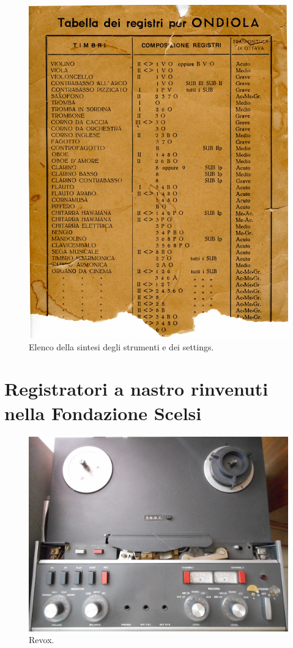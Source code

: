 \begin{figure}[H]
    \centering
    \includegraphics[width=.8\textwidth]{docs/ondiola-doc002.pdf}
    \caption{Elenco della sintesi degli strumenti e dei settings.}
\end{figure}

\section{Registratori a nastro rinvenuti nella Fondazione Scelsi}

\begin{figure}[H]
    \centering
    \includegraphics[width=.8\textwidth]{docs/img/DSCN0037.JPG}
    \caption{Revox.}
\end{figure}

